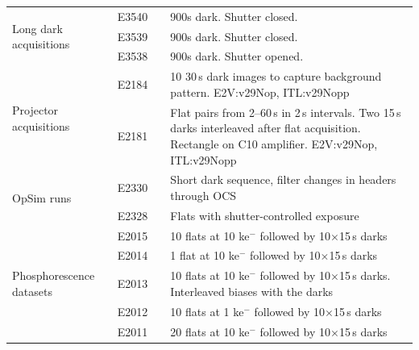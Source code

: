 \begin{longtable}{|p{2.5cm}|p{1.5cm}|p{2.9cm}|p{6.5cm}|}
\multirow{3}{*}{Long dark acquisitions} & E3540 &  & 900s dark. Shutter closed. \\ \cline{2-4} 
                                       & E3539 &  & 900s dark. Shutter closed. \\ \cline{2-4} 
                                       & E3538 &  & 900s dark. Shutter opened. \\ \hline

\multirow{2}{*}{Projector acquisitions} & E2184 &  & 10 30\,s dark images to capture background pattern. E2V:v29Nop, ITL:v29Nopp \\ \cline{2-4} 
                                        & E2181 &  & Flat pairs from 2--60\,s in 2\,s intervals. Two 15\,s darks interleaved after flat acquisition. Rectangle on C10 amplifier. E2V:v29Nop, ITL:v29Nopp \\ \hline

\multirow{2}{*}{OpSim runs}  & E2330 &           & Short dark sequence, filter changes in headers through OCS \\ \cline{2-4} 
                             & E2328 &           & Flats with shutter-controlled exposure \\ \hline

\multirow{5}{*}{Phosphorescence datasets} & E2015 & & 10 flats at 10 ke$^-$ followed by 10$\times$15\,s darks \\ \cline{2-4} 
                                          & E2014 & & 1 flat at 10 ke$^-$ followed by 10$\times$15\,s darks \\ \cline{2-4} 
                                          & E2013 & & 10 flats at 10 ke$^-$ followed by 10$\times$15\,s darks. Interleaved biases with the darks \\ \cline{2-4} 
                                          & E2012 & & 10 flats at 1 ke$^-$ followed by 10$\times$15\,s darks \\ \cline{2-4} 
                                          & E2011 & & 20 flats at 10 ke$^-$ followed by 10$\times$15\,s darks \\ \hline

\end{longtable}



